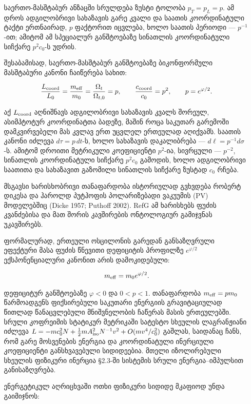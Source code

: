 \documentclass[11pt,a4paper]{article}
\begin{document}
საერთო-მასშტაბურ ანზაცში სრულდება ზუსტი ტოლობა $p_T=p_L=p$. ამ დროს ადგილობრივი სახაზავის გარე კვალი და საათის კოორდინატული ტაქტი ერთნაირად, $p$ ფაქტორით იცვლება, ხოლო საათის პერიოდი — $p^{-1}$-ით; ამიტომ ამ სპეციალურ განშტოებაზე სინათლის კოორდინატული სიჩქარე $p^2c_0$-ს უდრის.

შესაბამისად, საერთო-მასშტაბურ განშტოებაზე ბიკონფორმული მასშტაბური კანონი ჩაიწერება სახით:

\[
\frac{L_{\rm coord}}{L_0} = \frac{m_{\rm eff}}{m_0} = \frac{\Omega_t}{\Omega_{t,0}} = p, \qquad \frac{c_{\rm coord}}{c_0} = p^2, \qquad p = e^{\varphi/2}.
\]

აქ $L_{\rm coord}$ აღნიშნავს ადგილობრივი სახაზავის კვალს შორეულ, ასიმპტოტურ კოორდინატთა ბადეზე, მაშინ როცა საკუთარ გარემოში დამკვირვებელი მას კვლავ ერთ უცვლელ ერთეულად აღიქვამს. საათის კანონი იძლევა $d\tau=p\,dt$-ს, ხოლო სახაზავის დაკალიბრება — $d\ell=p^{-1}d\sigma$-ს. ამიტომ დროითი მეტრიკული კოეფიციენტი $p^2$-ია, სივრცული — $p^{-2}$, სინათლის კოორდინატული სიჩქარე $p^2c_0$ გამოდის, ხოლო ადგილობრივი საათითა და სახაზავით გაზომილი სინათლის სიჩქარე ზუსტად $c_0$ რჩება.

მსგავსი ხარისხობრივი თანაფარდობა ისტორიულად გვხვდება რობერტ დიკესა და ჰაროლდ პუტჰოფის პოლარიზებადი ვაკუუმის (PV) მოდელებშიც (Dicke 1957; Puthoff 2002). RefG ამ ხარისხებს ფუძის კვანძებისა და მათ შორის კავშირების ონტოლოგიურ გამიჯვნას უკავშირებს.

ფორმალურად, ერთეული ოსცილონის გარედან განსაზღვრული ეფექტური მასა ფუძის წნევითი დეფიციტის პროფილზე $e^{\varphi/2}$ ექსპონენციალური კანონით არის დამოკიდებული:

\[
m_{\rm eff} = m_0 e^{\varphi/2}.
\]

დეფიციტურ განშტოებაზე $\varphi<0$ და $0<p<1$. თანაფარდობა $m_{\rm eff}=pm_0$ წარმოადგენს ფიქსირებული საკუთარი ენერგიის გრავიტაციულად წითლად წანაცვლებული მნიშვნელობის ჩაწერას მასის ერთეულებში. სრული კოფრეიმის სტატიკურ მეტრიკაში სატესტო სხეულის ლაგრანჟიანი იძლევა $L=-mc_0^2N+\tfrac12mA_{\rm iso}^2N^{-1}v^2+O(mv^4/c_0^2)$ გაშლას, საიდანაც ჩანს, რომ გარე მოსვენების ენერგია და კოორდინატული ინერციული კოეფიციენტი განსხვავებული სიდიდეებია. მთელი იზოლირებული სხეულის ფიზიკური ინერცია §2.3-ში სისტემის სრული ენერგია–იმპულსით განისაზღვრება.

ენერგეტიკულ აღრიცხვაში ოთხი ფიზიკური სიდიდე მკაფიოდ უნდა გაიმიჯნოს:
\end{document}
